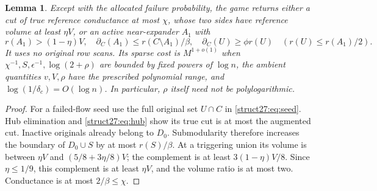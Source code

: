 \documentclass[11pt]{article}
\newtheorem{lemma}[theorem]{Lemma}
\theoremstyle{remark}
\begin{document}
\begin{lemma}\label{struct27:lem:game}
Except with the allocated failure probability, the game returns either a cut of
true reference conductance at most $\chi$, whose two sides have reference volume
at least $\eta V$, or an active near-expander $A_1$ with
\begin{equation}\label{struct27:eq:near}
 r(A_1)>(1-\eta)V,\quad
 \partial_C(A_1)\le r(C\setminus A_1)/\beta,\quad
 \partial_C(U)\ge\phi r(U)\quad(r(U)\le r(A_1)/2).
\end{equation}
It uses no original row scans.
Its sparse cost is $M^{1+o(1)}$ when
$\chi^{-1},S,\epsilon^{-1},\log(2+\rho)$ are bounded by fixed powers of $\log n$, the
ambient quantities $v,V,\rho$ have the prescribed polynomial range, and
$\log(1/\delta_c)=O(\log n)$.
In particular, $\rho$ itself need not be polylogarithmic.
\end{lemma} \begin{proof} For a failed-flow seed use the full original set
$U\cap C$ in \eqref{struct27:eq:seed}.
Hub elimination and \eqref{struct27:eq:hub} show its true cut is at most the
augmented cut.
Inactive originals already belong to $D_0$.
Submodularity therefore increases the boundary of $D_0\cup S$ by at most
$r(S)/\beta$.
At a triggering union its volume is between $\eta V$ and $(5/8+3\eta/8)V$; the
complement is at least $3(1-\eta)V/8$.
Since $\eta\le1/9$, this complement is at least $\eta V$, and the volume ratio
is at most two.
Conductance is at most $2/\beta\le\chi$.


\end{proof}
\end{document}

